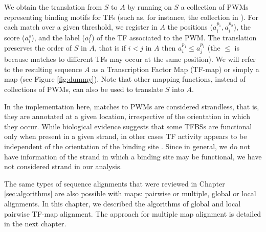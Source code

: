 We obtain the translation from $S$ to $A$ by running on $S$ a collection of 
PWMs representing binding motifs for TFs (such as, for instance, the collection 
in  \citep{matys:2003a}). For each match over a given threshold, we
register in $A$ the positions ($a_i^{p_1},a_i^{p_2}$), the score
($a_i^s$), and the label ($a_i^f$) of the TF associated to the PWM.
The translation preserves the order of $S$ in $A$, that is if $i < j$
in $A$ then $a_i^{p_1} \leq a_j^{p_1}$ (the $\leq$ is because matches
to different TFs may occur at the same position). We will refer to the
resulting sequence $A$ as a Transcription Factor Map (TF-map) 
  or simply a map (see Figure 
\ref{fig:dummy}).  Note that other mapping functions, instead of
collections of PWMs, can also be used to translate $S$ into $A$.

In the implementation here, matches to PWMs are considered strandless,
that is, they are annotated at a given location, irrespective of the
orientation in which they occur. While biological evidence 
suggests that some TFBSs are functional only when present in a given 
strand, in other cases TF activity appears to be independent
of the orientation of the binding site \citep{strachan:1999a}. 
Since in general, we do not have information of
the strand in which a binding site may be functional, we have not
considered strand in our analysis.

\label{sec:TF-map alignment}

  
 
The same types of sequence alignments that were reviewed in Chapter \ref{sec:algorithms} 
are also possible with maps: pairwise or multiple, global or local alignments. 
In this chapter, we described the algorithms of global and local pairwise TF-map alignment. 
The approach for multiple map alignment is detailed in the next chapter.

